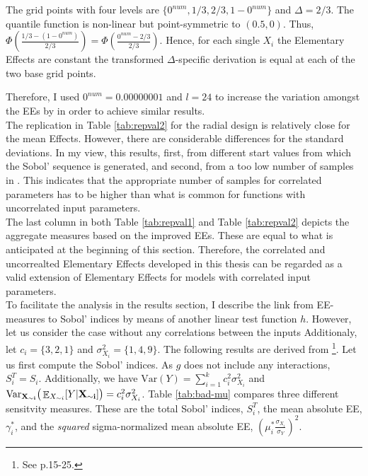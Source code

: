 \documentclass[a4paper,12pt]{article}
\DeclareMathOperator*{\E}{\mathbb{E}}
\begin{document}
\noindent
The grid points with four levels are $ \{ 0^{num}, 1/3, 2/3, 1-0^{num} \}$ and $\Delta=2/3$. The quantile function is non-linear but point-symmetric to $(0.5, 0)$. Thus, $\Phi(\frac{1/3 - (1-0^{num})}{2/3}) = \Phi(\frac{0^{num} - 2/3}{2/3})$. Hence, for each single $X_i$ the Elementary Effects are constant the transformed $\Delta$-specific derivation is equal at each of the two base grid points.

Therefore, I used $0^{num}=0.00000001$ and $l=24$ to increase the variation amongst the EEs by \cite{ge2017extending} in order to achieve similar results.\\

\noindent
The replication in Table \ref{tab:repval2} for the radial design is relatively close for the mean Effects. However, there are considerable differences for the standard deviations. In my view, this results, first, from different start values from which the Sobol' sequence is generated, and second, from a too low number of samples in \cite{ge2017extending}. This indicates that the appropriate number of samples for correlated parameters has to be higher than what is common for functions with uncorrelated input parameters.\\

\noindent
The last column in both Table \ref{tab:repval1} and Table \ref{tab:repval2} depicts the aggregate measures based on the improved EEs. These are equal to what is anticipated at the beginning of this section. Therefore, the correlated and uncorrealted Elementary Effects developed in this thesis can be regarded as a valid extension of Elementary Effects for models with correlated input parameters.\\

\noindent
To facilitate the analysis in the results section, I describe the link from EE-measures to Sobol' indices by means of another linear test function $h$. However, let us consider the case without any correlations between the inputs Additionaly, let $c_i = \{3,2,1\}$ and $\sigma^2_{X_i}=\{1,4,9\}$. The following results are derived from \cite{Saltelli.2008}\footnote{See p.15-25.}. Let us first compute the Sobol' indices. As $g$ does not include any interactions, $S_i^T = S_i$. Additionally, we have $\text{Var}(Y)=\sum_{i=1}^k c_i^2 \sigma_{X_i}^2$ and $\text{Var}_{\bold{X_{\sim i}}}\big( \E_{X_{\sim i}}[Y|\bold{X_{\sim i}]} \big) = c_i^2 \sigma_{X_i}^2$. Table \ref{tab:bad-mu} compares three different sensitvity measures. These are the total Sobol' indices, $S_i^T$, the mean absolute EE, $\gamma_i^*$, and the \textit{squared} sigma-normalized mean absolute EE, $(\mu_i^* \frac{\sigma_{X_i}}{\sigma_Y})^2$.  \\
\end{document}
